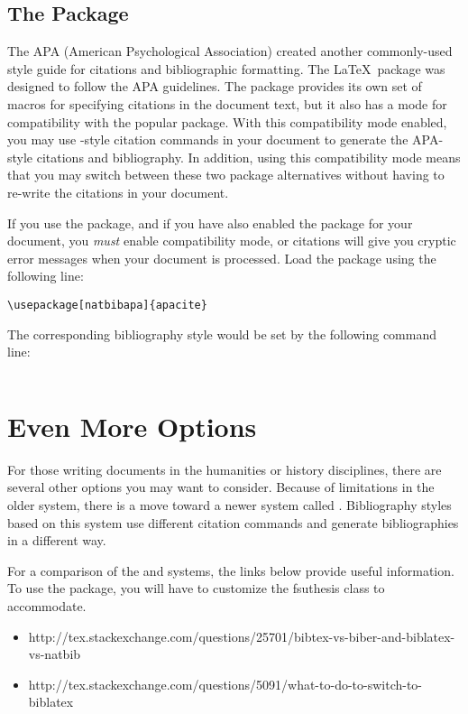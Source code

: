 \subsection{The  Package}
The APA (American Psychological Association) created another
commonly-used style guide for citations and bibliographic formatting.
The \LaTeX\ package  was designed to follow the APA
guidelines.  The package provides its own set of macros for specifying
citations in the document text, but it also has a mode for
compatibility with the popular  package.  With this
compatibility mode enabled, you may use -style citation
commands in your document to generate the APA-style citations and
bibliography.  In addition, using this compatibility mode means that
you may switch between these two package alternatives without having
to re-write the citations in your document.

If you use the  package, and if you have also enabled
the  package for your document, you \emph{must} enable
 compatibility mode, or citations will give you
cryptic error messages when your document is processed.  Load the
package using the following line:
\begin{verbatim}
\usepackage[natbibapa]{apacite}
\end{verbatim}
The corresponding bibliography style would be set by the following 
command line:
\begin{verbatim}

\end{verbatim}

\section{Even More Options}

For those writing documents in the humanities or history disciplines,
there are several other options you may want to consider.  Because
of limitations in the older \BibTeX{} system, there is a move toward a
newer system called .  Bibliography styles based on this
system use different citation commands and generate bibliographies
in a different way.

For a comparison of the \BibTeX{} and  systems, the
links below provide useful information.  To use the 
package, you will have to customize the \textsf{fsuthesis} class to
accommodate.
\begin{itemize}\small
\item \textsf{http://tex.stackexchange.com/questions/25701/bibtex-vs-biber-and-biblatex-vs-natbib}
\item \textsf{http://tex.stackexchange.com/questions/5091/what-to-do-to-switch-to-biblatex}
\end{itemize}

